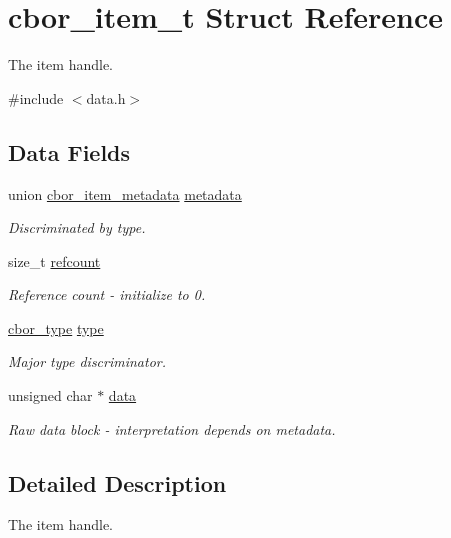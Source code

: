 \hypertarget{structcbor__item__t}{\section{cbor\-\_\-item\-\_\-t Struct Reference}
\label{structcbor__item__t}
}


The item handle.  




{\ttfamily \#include $<$data.\-h$>$}

\subsection*{Data Fields}
\begin{DoxyCompactItemize}
\item 
union \hyperlink{unioncbor__item__metadata}{cbor\-\_\-item\-\_\-metadata} \hyperlink{structcbor__item__t_a7d97fa5cdf027ca0499c37ec19acf843}{metadata}
\begin{DoxyCompactList}\small\item\em Discriminated by type. \end{DoxyCompactList}\item 
size\-\_\-t \hyperlink{structcbor__item__t_a6bb24fe655f086c6aa9a66d427e09cca}{refcount}
\begin{DoxyCompactList}\small\item\em Reference count -\/ initialize to 0. \end{DoxyCompactList}\item 
\hyperlink{data_8h_a3a931b40fc31b51cccfd1bc3dc5fc5d6}{cbor\-\_\-type} \hyperlink{structcbor__item__t_a6743a75cf89e1b455ddf3198ff98842a}{type}
\begin{DoxyCompactList}\small\item\em Major type discriminator. \end{DoxyCompactList}\item 
unsigned char $\ast$ \hyperlink{structcbor__item__t_a5c6dde1dbef5aad748c49786352eef44}{data}
\begin{DoxyCompactList}\small\item\em Raw data block -\/ interpretation depends on metadata. \end{DoxyCompactList}\end{DoxyCompactItemize}


\subsection{Detailed Description}
The item handle. 

